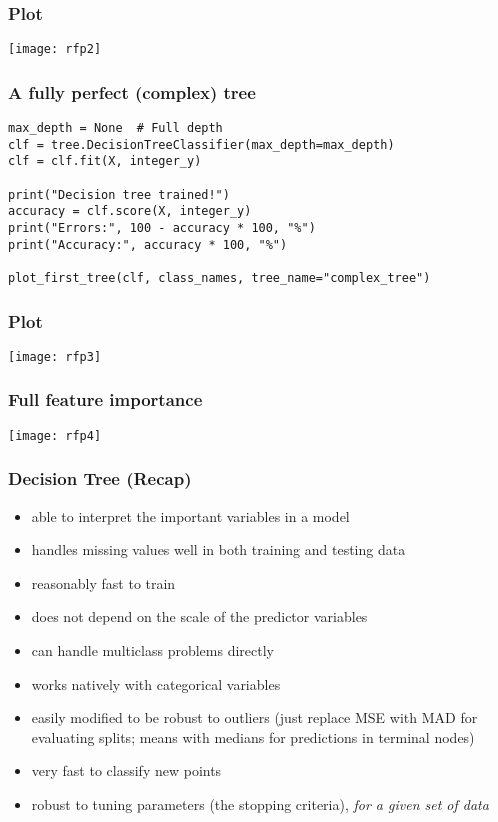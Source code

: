 \begin{frame}[fragile]\frametitle{Plot}
\begin{center}
\texttt{[image: rfp2]}
\end{center}
\end{frame}


\begin{frame}[fragile]\frametitle{A fully perfect (complex) tree}
\begin{lstlisting}
max_depth = None  # Full depth
clf = tree.DecisionTreeClassifier(max_depth=max_depth)
clf = clf.fit(X, integer_y)

print("Decision tree trained!")
accuracy = clf.score(X, integer_y)
print("Errors:", 100 - accuracy * 100, "%")
print("Accuracy:", accuracy * 100, "%")

plot_first_tree(clf, class_names, tree_name="complex_tree")
\end{lstlisting}
\end{frame}


\begin{frame}[fragile]\frametitle{Plot}
\begin{center}
\texttt{[image: rfp3]}
\end{center}
\end{frame}

\begin{frame}[fragile]\frametitle{Full feature importance}
\begin{center}
\texttt{[image: rfp4]}
\end{center}
\end{frame}

\begin{frame}[fragile] \frametitle{Decision Tree (Recap)}
\begin{itemize}
\item able to interpret the important variables in a model
\item handles missing values well in both training and testing data
\item reasonably fast to train
\item does not depend on the scale of the predictor variables
\item can handle multiclass problems directly
\item works natively with categorical variables
\item easily modified to be robust to outliers (just replace MSE with MAD
for evaluating splits; means with medians for predictions in terminal nodes)
\item very fast to classify new points
\item robust to tuning parameters (the stopping criteria), \textit{for a given set of data}
\end{itemize}
\end{frame}
